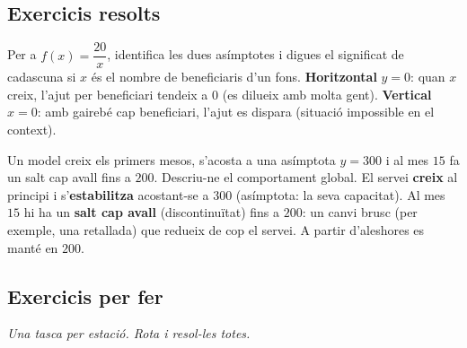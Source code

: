 \subsection{Exercicis resolts}

\begin{exresolt}
Per a $f(x)=\dfrac{20}{x}$, identifica les dues asímptotes i digues el significat de
cadascuna si $x$ és el nombre de beneficiaris d'un fons.
\solucio
\textbf{Horitzontal} $y=0$: quan $x$ creix, l'ajut per beneficiari tendeix a $0$ (es
dilueix amb molta gent). \textbf{Vertical} $x=0$: amb gairebé cap beneficiari, l'ajut
es dispara (situació impossible en el context).
\end{exresolt}

\begin{exresolt}
Un model creix els primers mesos, s'acosta a una asímptota $y=300$ i al mes $15$ fa un
salt cap avall fins a $200$. Descriu-ne el comportament global.
\solucio
El servei \textbf{creix} al principi i s'\textbf{estabilitza} acostant-se a $300$
(asímptota: la seva capacitat). Al mes $15$ hi ha un \textbf{salt cap avall}
(discontinuïtat) fins a $200$: un canvi brusc (per exemple, una retallada) que redueix
de cop el servei. A partir d'aleshores es manté en $200$.
\end{exresolt}

\subsection{Exercicis per fer}

\noindent\textit{Una tasca per estació. Rota i resol-les totes.}

